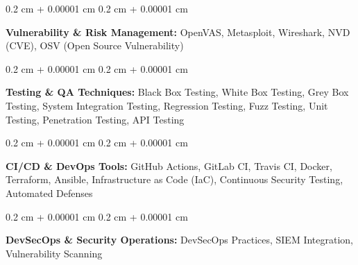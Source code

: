 \documentclass[10pt, a4paper]{article}
\newenvironment{onecolentry}{
    \begin{adjustwidth}{
        0.2 cm + 0.00001 cm
    }{
        0.2 cm + 0.00001 cm
    }
}{
    \end{adjustwidth}
} %
\begin{document}
        \vspace{0.5 cm}

        \begin{onecolentry}
            \textbf{Vulnerability \& Risk Management:} OpenVAS, Metasploit, Wireshark, NVD (CVE), OSV (Open Source Vulnerability)
        \end{onecolentry}

        \vspace{0.5 cm}

        \begin{onecolentry}
            \textbf{Testing \& QA Techniques:} Black Box Testing, White Box Testing, Grey Box Testing, System Integration Testing, Regression Testing, Fuzz Testing, Unit Testing, Penetration Testing, API Testing
        \end{onecolentry}

        \vspace{0.5 cm}

        \begin{onecolentry}
            \textbf{CI/CD \& DevOps Tools:} GitHub Actions, GitLab CI, Travis CI, Docker, Terraform, Ansible, Infrastructure as Code (IaC), Continuous Security Testing, Automated Defenses
        \end{onecolentry}

        \vspace{0.5 cm}

        \begin{onecolentry}
            \textbf{DevSecOps \& Security Operations:} DevSecOps Practices, SIEM Integration, Vulnerability Scanning
        \end{onecolentry}


    
\end{document}
